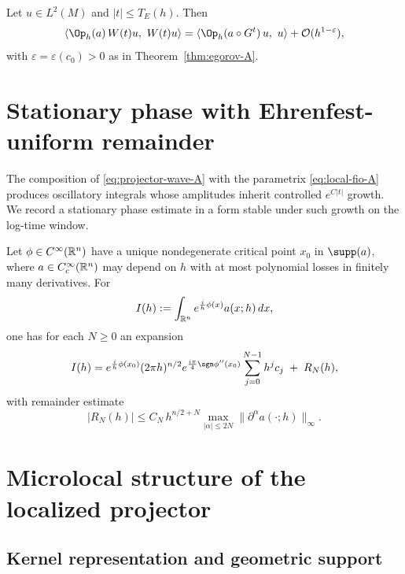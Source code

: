 \begin{corollary}\label{cor:expectations-A}
Let $u\in L^2(M)$ and $|t|\le T_E(h)$. Then
\[
\langle \Op_h(a)\,W(t)u,\ W(t)u\rangle
=\langle \Op_h(a\circ G^t)\,u,\ u\rangle+\mathcal O(h^{1-\varepsilon}),
\]
with $\varepsilon=\varepsilon(c_0)>0$ as in Theorem~\ref{thm:egorov-A}.
\end{corollary}

\section{Stationary phase with Ehrenfest-uniform remainder}\label{sec:ch5-stationary-phase}

\noindent
The composition of \eqref{eq:projector-wave-A} with the parametrix \eqref{eq:local-fio-A} produces oscillatory
integrals whose amplitudes inherit controlled $e^{C|t|}$ growth. We record a stationary phase estimate in a form
stable under such growth on the log-time window.

\begin{lemma}\label{lem:stationary-phase-A}
Let $\phi\in C^\infty(\mathbb{R}^n)$ have a unique nondegenerate critical point $x_0$ in $\supp(a)$, where
$a\in C_c^\infty(\mathbb{R}^n)$ may depend on $h$ with at most polynomial losses in finitely many derivatives. For
\[
I(h):=\int_{\mathbb{R}^n}e^{\frac{i}{h}\phi(x)}a(x;h)\,dx,
\]
one has for each $N\ge 0$ an expansion
\begin{equation}\label{eq:stationary-expansion-A}
I(h)=e^{\frac{i}{h}\phi(x_0)}(2\pi h)^{n/2}e^{\frac{i\pi}{4}\sgn\phi''(x_0)}
\sum_{j=0}^{N-1}h^j c_j\;+\;R_N(h),
\end{equation}
with remainder estimate
\begin{equation}\label{eq:stationary-remainder-A}
|R_N(h)|\le C_N\,h^{n/2+N}\max_{|\alpha|\le 2N}\|\partial^\alpha a(\cdot;h)\|_\infty.
\end{equation}
\end{lemma}

\section{Microlocal structure of the localized projector}\label{sec:ch5-projector-microlocal}

\subsection{Kernel representation and geometric support}\label{subsec:ch5-kernel}

